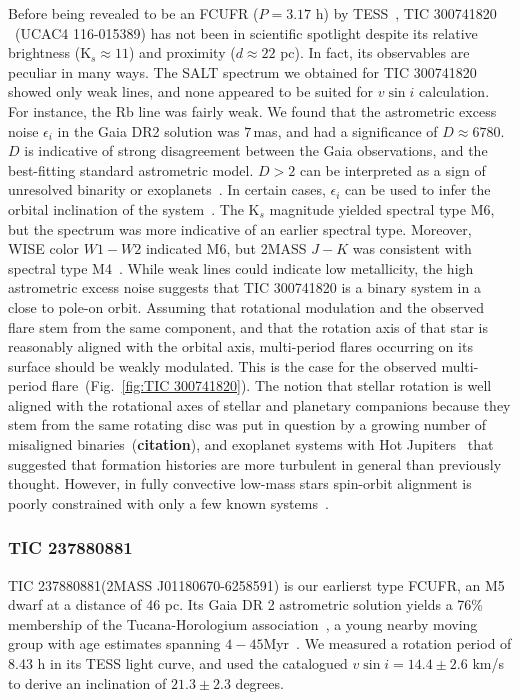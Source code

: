 \documentclass[fleqn,usenatbib,letters]{mnras}%
\newcommand{\FC}{TIC 237880881} %
\newcommand{\FF}{TIC 300741820} %
\begin{document}
Before being revealed to be an FCUFR ($P=3.17$ h) by TESS~\citep{zhan2019}, \FF\,~(UCAC4 116-015389) has not been in scientific spotlight despite its relative brightness (K$_s\approx11$) and proximity ($d\approx22$ pc). In fact, its observables are peculiar in many ways. The SALT spectrum we obtained for \FF\; showed only weak lines, and none appeared to be suited for $v \sin i$ calculation. For instance, the Rb line was fairly weak. We found that the astrometric excess noise $\epsilon_i$ in the Gaia DR2 solution was $7$\,mas, and had a significance of $D\approx6780$. $D$ is indicative of strong disagreement between the Gaia observations, and the best-fitting standard astrometric model. $D>2$ can be interpreted as a sign of unresolved binarity or exoplanets~\citep{lindegren2012}. In certain cases, $\epsilon_i$ can be used to infer the orbital inclination of the system~\citep{kiefer2019a, kiefer2019b}. The K$_s$ magnitude yielded spectral type M6, but the spectrum was more indicative of an earlier spectral type. Moreover, WISE color $W1-W2$ indicated M6, but 2MASS $J-K$ was consistent with spectral type M4~\citep{pecaut2013}. While weak lines could indicate low metallicity, the high astrometric excess noise suggests that \FF\; is a binary system in a close to pole-on orbit. Assuming that rotational modulation and the observed flare stem from the same component, and that the rotation axis of that star is reasonably aligned with the orbital axis, multi-period flares occurring on its surface should be weakly modulated. This is the case for the observed multi-period flare~(Fig.~\ref{fig:\FF}). The notion that stellar rotation is well aligned with the rotational axes of stellar and planetary companions because they stem from the same rotating disc was put in question by a growing number of misaligned binaries~(\textbf{citation}), and exoplanet systems with Hot Jupiters~\citep{winn2010} that suggested that formation histories are more turbulent in general than previously thought. However, in fully convective low-mass stars spin-orbit alignment is poorly constrained with only a few known systems~\citep{konopacky2012, harding2013, zhang2020}.

\subsubsection{\FC}
\label{sec:propsC}
\FC\;(2MASS J01180670-6258591) is our earlierst type FCUFR, an M5 dwarf at a distance of 46 pc. Its Gaia DR 2 astrometric solution yields a 76\% membership of the Tucana-Horologium association~\citep{ujjwal2020}, a young nearby moving group with age estimates spanning $4-45$\;Myr~\citep{ujjwal2020, bell2015, kraus2014}. We measured a rotation period of 8.43 h in its TESS light curve, and used the catalogued $v\sin i=14.4\pm2.6$ km/s~\citep{kraus2014} to derive an inclination of $21.3\pm2.3$ degrees.
\end{document}
